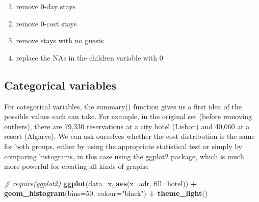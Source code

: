 \documentclass[
]{article}
\newenvironment{Shaded}{\begin{snugshade}}{\end{snugshade}}
\newcommand{\AttributeTok}[1]{\textcolor[rgb]{0.13,0.29,0.53}{#1}}
\newcommand{\CommentTok}[1]{\textcolor[rgb]{0.56,0.35,0.01}{\textit{#1}}}
\newcommand{\DecValTok}[1]{\textcolor[rgb]{0.00,0.00,0.81}{#1}}
\newcommand{\FunctionTok}[1]{\textcolor[rgb]{0.13,0.29,0.53}{\textbf{#1}}}
\newcommand{\NormalTok}[1]{#1}
\newcommand{\OtherTok}[1]{\textcolor[rgb]{0.56,0.35,0.01}{#1}}
\newcommand{\SpecialCharTok}[1]{\textcolor[rgb]{0.81,0.36,0.00}{\textbf{#1}}}
\newcommand{\StringTok}[1]{\textcolor[rgb]{0.31,0.60,0.02}{#1}}
\providecommand{\tightlist}{%
  \setlength{\itemsep}{0pt}\setlength{\parskip}{0pt}}
\begin{document}
\begin{enumerate}
\def\labelenumi{\arabic{enumi})}
\tightlist
\item
  remove 0-day stays
\item
  remove 0-cost stays
\item
  remove stays with no guests
\item
  replace the NAs in the children variable with 0
\end{enumerate}

\begin{Shaded}
\end{Shaded}

\subsection{Categorical variables}\label{categorical-variables}

For categorical variables, the summary() function gives us a first idea
of the possible values each can take. For example, in the original set
(before removing outliers), there are 79,330 reservations at a city
hotel (Lisbon) and 40,060 at a resort (Algarve). We can ask ourselves
whether the cost distribution is the same for both groups, either by
using the appropriate statistical test or simply by comparing
histograms, in this case using the ggplot2 package, which is much more
powerful for creating all kinds of graphs:

\begin{Shaded}
\begin{Highlighting}[]
\CommentTok{\# require(ggplot2)}
\FunctionTok{ggplot}\NormalTok{(}\AttributeTok{data=}\NormalTok{x, }\FunctionTok{aes}\NormalTok{(}\AttributeTok{x=}\NormalTok{adr, }\AttributeTok{fill=}\NormalTok{hotel)) }\SpecialCharTok{+} 
  \FunctionTok{geom\_histogram}\NormalTok{(}\AttributeTok{bins=}\DecValTok{50}\NormalTok{, }\AttributeTok{colour=}\StringTok{"black"}\NormalTok{) }\SpecialCharTok{+}
  \FunctionTok{theme\_light}\NormalTok{()}
\end{Highlighting}
\end{Shaded}
\end{document}
